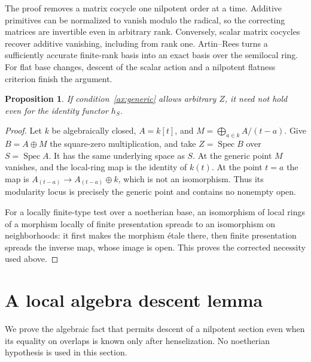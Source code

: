 \documentclass[11pt]{article}
\newtheorem{proposition}[theorem]{Proposition}
\theoremstyle{definition}\newtheorem{definition}[theorem]{Definition}
\theoremstyle{remark}\newtheorem{remark}[theorem]{Remark}
\newcommand{\Spec}{\operatorname{Spec}}
\begin{document}
The proof removes a matrix cocycle one nilpotent order at a time. Additive primitives can be normalized to vanish modulo the radical, so the correcting matrices are invertible even in arbitrary rank. Conversely, scalar matrix cocycles recover additive vanishing, including from rank one. Artin--Rees turns a sufficiently accurate finite-rank basis into an exact basis over the semilocal ring. For flat base changes, descent of the scalar action and a nilpotent flatness criterion finish the argument.

\begin{proposition}\label{prop:finite-type}
If condition~\ref{ax:generic} allows arbitrary $Z$, it need not hold even for the identity functor $h_S$.
\end{proposition}
\begin{proof}
Let $k$ be algebraically closed, $A=k[t]$, and $M=\bigoplus_{a\in k}A/(t-a)$. Give $B=A\oplus M$ the square-zero multiplication, and take $Z=\Spec B$ over $S=\Spec A$. It has the same underlying space as $S$. At the generic point $M$ vanishes, and the local-ring map is the identity of $k(t)$. At the point $t=a$ the map is $A_{(t-a)}\to A_{(t-a)}\oplus k$, which is not an isomorphism. Thus its modularity locus is precisely the generic point and contains no nonempty open.

For a locally finite-type test over a noetherian base, an isomorphism of local rings of a morphism locally of finite presentation spreads to an isomorphism on neighborhoods: it first makes the morphism \'etale there, then finite presentation spreads the inverse map, whose image is open. This proves the corrected necessity used above.
\end{proof}

\section{A local algebra descent lemma}\label{sec:localalgebra}

We prove the algebraic fact that permits descent of a nilpotent section even when its equality on overlaps is known only after henselization. No noetherian hypothesis is used in this section.
\end{document}
